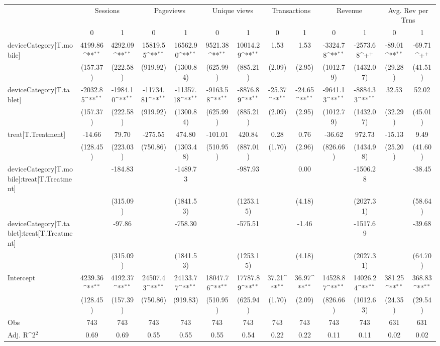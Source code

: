 {
\def\sym#1{\ifmmode^{#1}\else\(^{#1}\)\fi}
\begin{tabular}{@{\extracolsep{2pt}}l*{12}{c}@{}}
\hline\hline
& \multicolumn{2}{c}{Sessions} & \multicolumn{2}{c}{Pageviews} & \multicolumn{2}{c}{Unique views} & \multicolumn{2}{c}{Transactions} & \multicolumn{2}{c}{Revenue} & \multicolumn{2}{c}{Avg. Rev per Trns} \\
\cline{2-3}
\cline{4-5}
\cline{6-7}
\cline{8-9}
\cline{10-11}
\cline{12-13}
 & 0 & 1 & 0 & 1 & 0 & 1 & 0 & 1 & 0 & 1 & 0 & 1 \\
\hline
deviceCategory[T.mobile] & 4199.86\sym{**} & 4292.09\sym{**} & 15819.55\sym{**} & 16562.90\sym{**} & 9521.38\sym{**} & 10014.29\sym{**} & 1.53 & 1.53 & -3324.78\sym{**} & -2573.68\sym{+} & -89.01\sym{**} & -69.71\sym{+} \\
 & (157.37) & (222.58) & (919.92) & (1300.84) & (625.99) & (885.21) & (2.09) & (2.95) & (1012.79) & (1432.07) & (29.28) & (41.51) \\
deviceCategory[T.tablet] & -2032.85\sym{**} & -1984.10\sym{**} & -11734.81\sym{**} & -11357.18\sym{**} & -9163.58\sym{**} & -8876.89\sym{**} & -25.37\sym{**} & -24.65\sym{**} & -9641.13\sym{**} & -8884.33\sym{**} & 32.53 & 52.02 \\
 & (157.37) & (222.58) & (919.92) & (1300.84) & (625.99) & (885.21) & (2.09) & (2.95) & (1012.79) & (1432.07) & (32.29) & (45.01) \\
treat[T.Treatment] & -14.66 & 79.70 & -275.55 & 474.80 & -101.01 & 420.84 & 0.28 & 0.76 & -36.62 & 972.73 & -15.13 & 9.49 \\
 & (128.45) & (223.03) & (750.86) & (1303.48) & (510.95) & (887.01) & (1.70) & (2.96) & (826.66) & (1434.98) & (25.20) & (41.60) \\
deviceCategory[T.mobile]:treat[T.Treatment] &  & -184.83 &  & -1489.73 &  & -987.93 &  & 0.00 &  & -1506.28 &  & -38.45 \\
 &  & (315.09) &  & (1841.53) &  & (1253.15) &  & (4.18) &  & (2027.31) &  & (58.64) \\
deviceCategory[T.tablet]:treat[T.Treatment] &  & -97.86 &  & -758.30 &  & -575.51 &  & -1.46 &  & -1517.69 &  & -39.68 \\
 &  & (315.09) &  & (1841.53) &  & (1253.15) &  & (4.18) &  & (2027.31) &  & (64.70) \\
Intercept & 4239.36\sym{**} & 4192.37\sym{**} & 24507.43\sym{**} & 24133.77\sym{**} & 18047.76\sym{**} & 17787.89\sym{**} & 37.21\sym{**} & 36.97\sym{**} & 14528.87\sym{**} & 14026.24\sym{**} & 381.25\sym{**} & 368.83\sym{**} \\
 & (128.45) & (157.39) & (750.86) & (919.83) & (510.95) & (625.94) & (1.70) & (2.09) & (826.66) & (1012.63) & (24.35) & (29.54) \\

\hline
Obs & 743 & 743 & 743 & 743 & 743 & 743 & 743 & 743 & 743 & 743 & 631 & 631 \\
Adj. R\sym{2} & 0.69 & 0.69 & 0.55 & 0.55 & 0.55 & 0.54 & 0.22 & 0.22 & 0.11 & 0.11 & 0.02 & 0.02 \\
\hline\hline
\end{tabular}
}